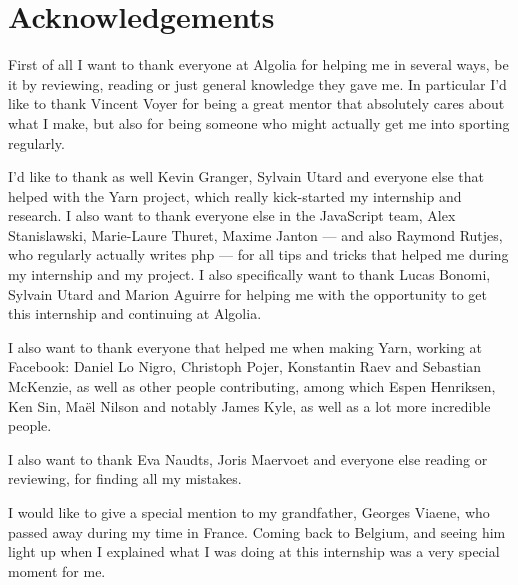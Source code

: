 
\chapter{Acknowledgements}%
\label{chp:acknowledgements}

First of all I want to thank everyone at Algolia for helping me in several ways, be it by reviewing, reading or just general knowledge they gave me. In particular I'd like to thank Vincent Voyer for being a great mentor that absolutely cares about what I make, but also for being someone who might actually get me into sporting regularly.

I'd like to thank as well Kevin Granger, Sylvain Utard and everyone else that helped with the Yarn project, which really kick-started my internship and research. I also want to thank everyone else in the JavaScript team, Alex Stanislawski, Marie-Laure Thuret, Maxime Janton --- and also Raymond Rutjes, who regularly actually writes php --- for all tips and tricks that helped me during my internship and my project. I also specifically want to thank Lucas Bonomi, Sylvain Utard and Marion Aguirre for helping me with the opportunity to get this internship and continuing at Algolia.

I also want to thank everyone that helped me when making Yarn, working at Facebook: Daniel Lo Nigro, Christoph Pojer, Konstantin Raev and Sebastian McKenzie, as well as other people contributing, among which Espen Henriksen, Ken Sin, Maël Nilson and notably James Kyle, as well as a lot more incredible people.

I also want to thank Eva Naudts, Joris Maervoet and everyone else reading or reviewing, for finding all my mistakes.

I would like to give a special mention to my grandfather, Georges Viaene, who passed away during my time in France. Coming back to Belgium, and seeing him light up when I explained what I was doing at this internship was a very special moment for me. 
